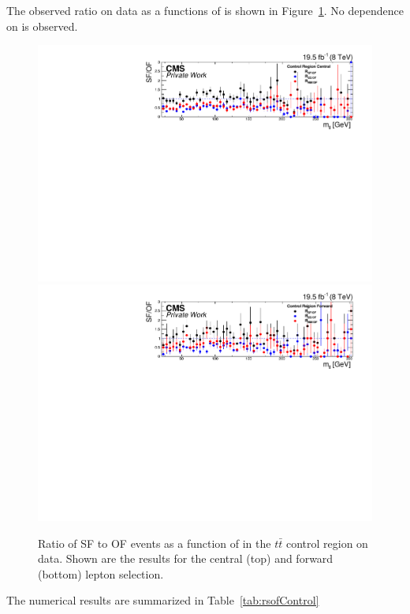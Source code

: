 The observed ratio on data as a functions of \mll is shown in Figure~\ref{fig:controlRatio}. No dependence on \mll is observed.
\begin{figure}
\begin{center}
\includegraphics[scale=0.35]{plots/BG/control/rSFOF_ControlCentral_Full2012_Mll_None.pdf}\\
\includegraphics[scale=0.35]{plots/BG/control/rSFOF_ControlForward_Full2012_Mll_None.pdf}
\caption{Ratio of SF to OF events as a function of \mll in the $t\bar{t}$ control region on data. Shown are the results for the central (top) and forward (bottom) lepton selection.}
\label{fig:controlRatio}
\end{center}
\end{figure}
The numerical results are summarized in Table~\ref{tab:rsofControl}

